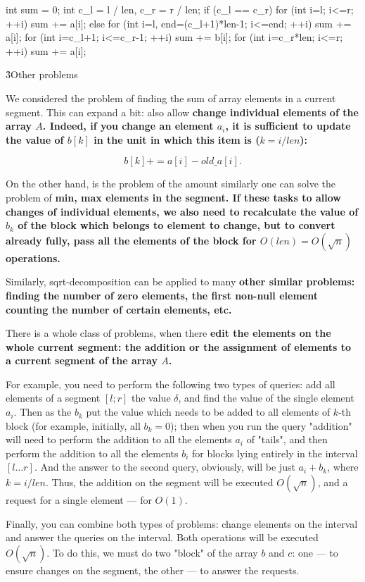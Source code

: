 \code
int sum = 0;
int c_l = l / len, c_r = r / len;
if (c_l == c_r)
for (int i=l; i<=r; ++i)
sum += a[i];
else {
for (int i=l, end=(c_l+1)*len-1; i<=end; ++i)
sum += a[i];
for (int i=c_l+1; i<=c_r-1; ++i)
sum += b[i];
for (int i=c_r*len; i<=r; ++i)
sum += a[i];
}
\endcode


\h3{Other problems}

We considered the problem of finding the sum of array elements in a current segment. This can expand a bit: also allow \bf{change} individual elements of the array $A$. Indeed, if you change an element $a_i$, it is sufficient to update the value of $b[k]$ in the unit in which this item is ($k = i / len$):

$$ b[k] += a[i] - old\_a[i]. $$

On the other hand, is the problem of the amount similarly one can solve the problem of \bf{min, max} elements in the segment. If these tasks to allow changes of individual elements, we also need to recalculate the value of $b_k$ of the block which belongs to element to change, but to convert already fully, pass all the elements of the block for $O(len) = O(\sqrt{n})$ operations.

Similarly, sqrt-decomposition can be applied to many \bf{other} similar problems: finding the number of zero elements, the first non-null element counting the number of certain elements, etc.

There is a whole class of problems, when there \bf{edit the elements on the whole current segment}: the addition or the assignment of elements to a current segment of the array $A$.

For example, you need to perform the following two types of queries: add all elements of a segment $[l;r]$ the value $\delta$, and find the value of the single element $a_i$. Then as the $b_k$ put the value which needs to be added to all elements of $k$-th block (for example, initially, all $b_k = 0$); then when you run the query "addition" will need to perform the addition to all the elements $a_i$ of "tails", and then perform the addition to all the elements $b_i$ for blocks lying entirely in the interval $[l \ldots r]$. And the answer to the second query, obviously, will be just $a_i + b_k$, where $k = i / len$. Thus, the addition on the segment will be executed $O(\sqrt{n})$, and a request for a single element --- for $O(1)$.

Finally, you can combine both types of problems: change elements on the interval and answer the queries on the interval. Both operations will be executed $O(\sqrt{n})$. To do this, we must do two "block" of the array $b$ and $c$: one --- to ensure changes on the segment, the other --- to answer the requests.

